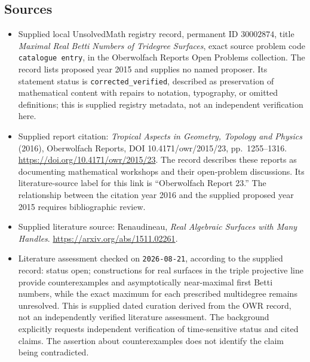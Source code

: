 \documentclass[11pt]{article}
\begin{document}
\subsection{Sources}
\begin{itemize}
\item Supplied local UnsolvedMath registry record, permanent ID \(30002874\), title \emph{Maximal Real Betti Numbers of Tridegree Surfaces}, exact source problem code \texttt{catalogue entry}, in the Oberwolfach Reports Open Problems collection. The record lists proposed year 2015 and supplies no named proposer. Its statement status is \texttt{corrected\_verified}, described as preservation of mathematical content with repairs to notation, typography, or omitted definitions; this is supplied registry metadata, not an independent verification here.
\item Supplied report citation: \emph{Tropical Aspects in Geometry, Topology and Physics} (2016), Oberwolfach Reports, DOI 10.4171/owr/2015/23, pp.\ 1255--1316. \url{https://doi.org/10.4171/owr/2015/23}. The record describes these reports as documenting mathematical workshops and their open-problem discussions. Its literature-source label for this link is ``Oberwolfach Report 23.'' The relationship between the citation year 2016 and the supplied proposed year 2015 requires bibliographic review.
\item Supplied literature source: Renaudineau, \emph{Real Algebraic Surfaces with Many Handles}. \url{https://arxiv.org/abs/1511.02261}.
\item Literature assessment checked on \texttt{2026-08-21}, according to the supplied record: status open; constructions for real surfaces in the triple projective line provide counterexamples and asymptotically near-maximal first Betti numbers, while the exact maximum for each prescribed multidegree remains unresolved. This is supplied dated curation derived from the OWR record, not an independently verified literature assessment. The background explicitly requests independent verification of time-sensitive status and cited claims. The assertion about counterexamples does not identify the claim being contradicted.
\end{itemize}
\end{document}
